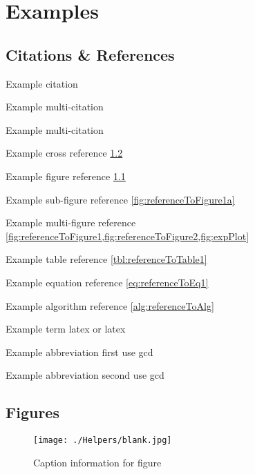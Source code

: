 \chapter{Examples}




\section{Citations \& References}

Example citation \cite{smit54}

Example multi-citation \cite{smit54,colu92}

Example multi-citation \cite{smit54,colu92,gree00}

Example cross reference \cref{examples:figures}

Example figure reference \cref{fig:referenceToFigure1}

Example sub-figure reference \cref{fig:referenceToFigure1a}

Example multi-figure reference \cref{fig:referenceToFigure1,fig:referenceToFigure2,fig:expPlot}

Example table reference \cref{tbl:referenceToTable1}

Example equation reference \cref{eq:referenceToEq1}

Example algorithm reference \cref{alg:referenceToAlg}

Example term \gls{latex} or \Gls{latex}

Example abbreviation first use \gls{gcd}

Example abbreviation second use \gls{gcd}


\section{Figures} \label{examples:figures}

\begin{figure}[H]
    \centering
    \texttt{[image: ./Helpers/blank.jpg]}
    \caption{Caption information for figure} 
    \label{fig:referenceToFigure1}
\end{figure}

